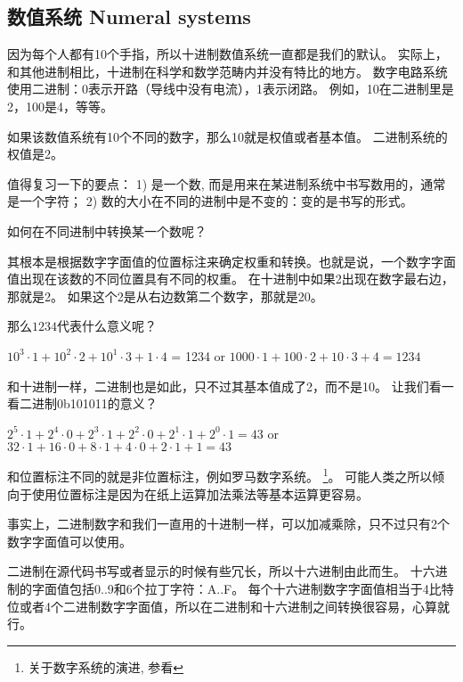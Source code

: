 \documentclass[UTF8,nofonts]{ctexart}
\begin{document}

\subsection{数值系统 Numeral systems}

因为每个人都有10个手指，所以十进制数值系统一直都是我们的默认。
实际上，和其他进制相比，十进制在科学和数学范畴内并没有特比的地方。
数字电路系统使用二进制：0表示开路（导线中没有电流），1表示闭路。
例如，10在二进制里是2，100是4，等等。

如果该数值系统有10个不同的数字，那么10就是权值或者基本值。
二进制系统的权值是2。

值得复习一下的要点：
1) 是一个数, 而是用来在某进制系统中书写数用的，通常是一个字符；
2) 数的大小在不同的进制中是不变的：变的是书写的形式。

如何在不同进制中转换某一个数呢？

其根本是根据数字字面值的位置标注来确定权重和转换。也就是说，一个数字字面值出现在该数的不同位置具有不同的权重。
在十进制中如果2出现在数字最右边，那就是2。
如果这个2是从右边数第二个数字，那就是20。

那么$1234$代表什么意义呢？

$10^3 \cdot 1 + 10^2 \cdot 2 + 10^1 \cdot 3 + 1 \cdot 4$ = 1234 or 
$1000 \cdot 1 + 100 \cdot 2 + 10 \cdot 3 + 4 = 1234$

和十进制一样，二进制也是如此，只不过其基本值成了2，而不是10。
让我们看一看二进制0b101011的意义？

$2^5 \cdot 1 + 2^4 \cdot 0 + 2^3 \cdot 1 + 2^2 \cdot 0 + 2^1 \cdot 1 + 2^0 \cdot 1 = 43$ or
$32 \cdot 1 + 16 \cdot 0 + 8 \cdot 1 + 4 \cdot 0 + 2 \cdot 1 + 1 = 43$

和位置标注不同的就是非位置标注，例如罗马数字系统。
\footnote{关于数字系统的演进, 参看}。
可能人类之所以倾向于使用位置标注是因为在纸上运算加法乘法等基本运算更容易。

事实上，二进制数字和我们一直用的十进制一样，可以加减乘除，只不过只有2个数字字面值可以使用。

二进制在源代码书写或者显示的时候有些冗长，所以十六进制由此而生。
十六进制的字面值包括0..9和6个拉丁字符：A..F。
每个十六进制数字字面值相当于4比特位或者4个二进制数字字面值，所以在二进制和十六进制之间转换很容易，心算就行。
\end{document}
